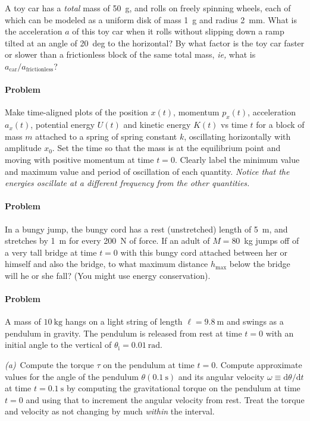 \documentclass[12pt]{article}
\newcounter{problem}
\begin{document}
A toy car has a \emph{total} mass of 50~g, and rolls on freely
spinning wheels, each of which can be modeled as a uniform disk of
mass 1~g and radius 2~mm.  What is the acceleration $a$ of this toy
car when it rolls without slipping down a ramp tilted at an angle of
20~deg to the horizontal?  By what factor is the toy car faster or
slower than a frictionless block of the same total mass, \textit{ie,}
what is $a_\mathrm{car}/a_\mathrm{frictionless}$?

\paragraph{Problem~\theproblem}

Make time-aligned plots of the position $x(t)$, momentum $p_x(t)$,
acceleration $a_x(t)$, potential energy $U(t)$ and kinetic energy
$K(t)$ vs time $t$ for a block of mass $m$ attached to a spring of
spring constant $k$, oscillating horizontally with amplitude $x_0$.
Set the time so that the mass is at the equilibrium point and moving
with positive momentum at time $t=0$.  Clearly label the minimum value
and maximum value and period of oscillation of each quantity.
\emph{Notice that the energies oscillate at a different frequency from
the other quantities.}

\paragraph{Problem~\theproblem}

In a bungy jump, the bungy cord has a rest (unstretched) length of
5~m, and stretches by 1~m for every 200~N of force.  If an adult of
$M=80$~kg jumps off of a very tall bridge at time $t=0$ with this
bungy cord attached between her or himself and also the bridge, to
what maximum distance $h_\mathrm{max}$ below the bridge will he or she
fall?  (You might use energy conservation).

\paragraph{Problem~\theproblem}

A mass of $10~\mathrm{kg}$ hangs on a light string of length $\ell=
9.8~\mathrm{m}$ and swings as a pendulum in gravity.  The pendulum is
released from rest at time $t=0$ with an initial angle to the vertical
of $\theta_\mathrm{i}= 0.01~\mathrm{rad}$.

\textsl{(a)}~Compute the torque $\tau$ on the pendulum at time $t=0$.
Compute approximate values for the angle of the pendulum $\theta
(0.1~\mathrm{s})$ and its angular velocity
$\omega\equiv\mathrm{d}\theta/\mathrm{d}t$ at time $t=0.1~\mathrm{s}$
by computing the gravitational torque on the pendulum at time $t=0$
and using that to increment the angular velocity from rest.  Treat the
torque and velocity as not changing by much \emph{within} the
interval.
\end{document}
